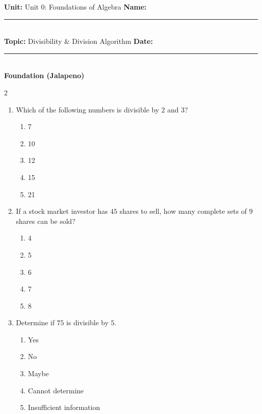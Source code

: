 \documentclass[10pt]{article}
\begin{document}
\enlargethispage{2.5cm}

\begin{tcolorbox}[colback=mainblue!5, colframe=mainblue, sharp corners, boxrule=0.5pt]
    \small \textbf{Unit:} Unit 0: Foundations of Algebra \hfill \textbf{Name:} \rule{3cm}{0.4pt} \\
    \small \textbf{Topic:} Divisibility & Division Algorithm \hfill \textbf{Date:} \rule{2cm}{0.4pt} \\
    \centering \textbf{\large Foundation (Jalapeno)}
\end{tcolorbox}

\vspace{0.2cm}

\begin{multicols}{2}
\begin{enumerate}[label=\textbf{Q\arabic*.}, leftmargin=*, itemsep=6pt, parsep=0pt]

  \item \small Which of the following numbers is divisible by $2$ and $3$?
  \begin{enumerate}[label=(\Alph*), leftmargin=0.6cm, nosep, itemsep=2pt]
    \item 7
    \item 10
    \item 12
    \item 15
    \item 21
  \end{enumerate}

  \item \small If a stock market investor has $45$ shares to sell, how many complete sets of $9$ shares can be sold?
  \begin{enumerate}[label=(\Alph*), leftmargin=0.6cm, nosep, itemsep=2pt]
    \item 4
    \item 5
    \item 6
    \item 7
    \item 8
  \end{enumerate}

  \item \small Determine if $75$ is divisible by $5$.
  \begin{enumerate}[label=(\Alph*), leftmargin=0.6cm, nosep, itemsep=2pt]
    \item Yes
    \item No
    \item Maybe
    \item Cannot determine
    \item Insufficient information
  \end{enumerate}


\end{enumerate}
\end{multicols}
\end{document}
